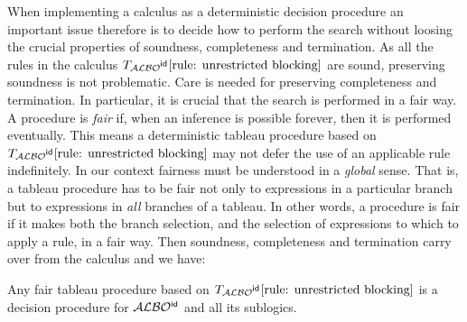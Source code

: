 \documentclass[leqno
,pdflatex
,prodmode
,acmtocl
]{acmsmall}
\newcommand{\mathcmd}[1]{\ensuremath{#1}\xspace}
\newcommand{\dlfont}{\mathcal}
\newcommand{\dl}[1]{\mathcmd{\dlfont{#1}}}
\newcommand{\idRole}{\mathcmd{\textsf{\upshape\mdseries id}}}
\newcommand{\ALBOid}{\dl{ALBO\smash[t]{\mbox{${}^{\idRole}$}}}}
\newcommand{\TALBOidub}{\mathcmd{T_\ALBOid\eqref{rule: unrestricted blocking}}}
\begin{document}
When implementing a calculus as a deterministic
decision procedure an important issue therefore is to decide how to perform the
search without loosing the crucial properties of soundness, completeness
and termination. As all the rules in the calculus \TALBOidub are sound, preserving
soundness is not problematic.
Care is needed for preserving completeness and termination.
In particular, it is crucial that the search is performed in a fair way.
A procedure is \emph{fair} if, when an inference is possible forever,
then it is performed eventually.
This means a deterministic tableau procedure
based on \TALBOidub
may not defer the use of an applicable rule indefinitely.
In our context fairness must be understood in a \emph{global} sense.
That is, a tableau procedure has to be fair not only to expressions in
a particular branch but to expressions in \emph{all} branches of a tableau.
In other words, a procedure is fair if it makes both the branch
selection, and the selection of expressions to which to apply a rule,
in a fair way.
Then soundness, completeness and termination carry over from the
calculus and we have:

\begin{theorem}
Any fair tableau procedure based on \TALBOidub is a decision procedure for
\ALBOid and all its sublogics.
\end{theorem}
\end{document}
